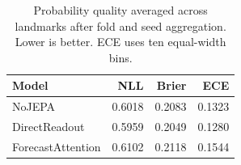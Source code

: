 \begin{table}[t]
\centering
\small
\caption{Probability quality averaged across landmarks after fold and seed aggregation. Lower is better. ECE uses ten equal-width bins.}
\label{tab:calibration}
\begin{tabular}{lrrr}
\toprule
Model & NLL & Brier & ECE \\
\midrule
NoJEPA & 0.6018 & 0.2083 & 0.1323 \\
DirectReadout & 0.5959 & 0.2049 & 0.1280 \\
ForecastAttention & 0.6102 & 0.2118 & 0.1544 \\
\bottomrule
\end{tabular}
\end{table}
